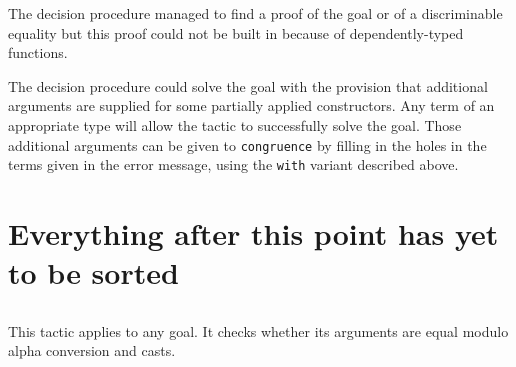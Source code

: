 \begin{ErrMsgs}
  \item {}

    The decision procedure managed to find a proof of the goal or of
    a discriminable equality but this proof could not be built in {\Coq}
    because of dependently-typed functions.

  \item {}

    The decision procedure could solve the goal with the provision
    that additional arguments are supplied for some partially applied
    constructors. Any term of an appropriate type will allow the
    tactic to successfully solve the goal. Those additional arguments
    can be given to {\tt congruence} by filling in the holes in the
    terms given in the error message, using the {\tt with} variant
    described above.
\end{ErrMsgs}





































\section{Everything after this point has yet to be sorted}


\subsection{}
\label{constreq}

This tactic applies to any goal. It checks whether its arguments are
equal modulo alpha conversion and casts.

